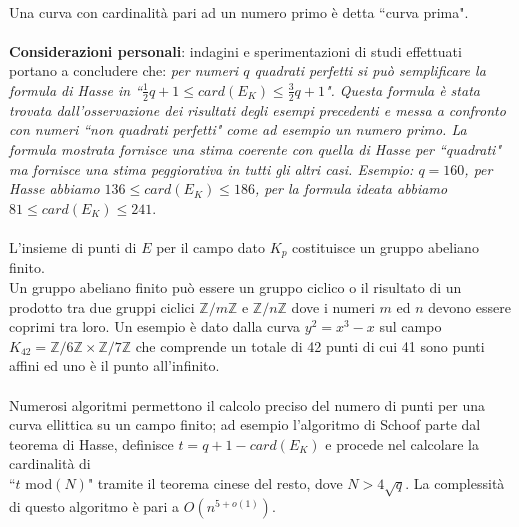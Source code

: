 \documentclass[a4paper,12pt]{tesiinfo}
\newcommand\ddfrac[2]{\frac{\displaystyle #1}{\displaystyle #2}}
\begin{document}
\\
Una curva con cardinalit\`a pari ad un numero primo \`e detta ``curva prima".
\\
\\
\textbf{Considerazioni personali}: indagini e sperimentazioni di studi effettuati portano a concludere che: \textit{per numeri $q$ quadrati perfetti si pu\`o semplificare la formula di Hasse in ``$ \ddfrac{1}{2}q +1 \le card(E_K) \le \ddfrac{3}{2}q +1$". Questa formula \`e stata trovata dall'osservazione dei risultati degli esempi precedenti e messa a confronto con numeri ``non quadrati perfetti" come ad esempio un numero primo. La formula mostrata fornisce una stima coerente con quella di Hasse per ``quadrati" ma fornisce una stima peggiorativa in tutti gli altri casi. Esempio: $q=160$, per Hasse abbiamo $136 \le card(E_K) \le 186$, per la formula ideata abbiamo $81 \le card(E_K) \le 241$}. 
\\
\\
L'insieme di punti di $E$ per il campo dato $K_p$ costituisce un gruppo abeliano finito. 
\\
Un gruppo abeliano finito pu\`o essere un gruppo ciclico o il risultato di un prodotto tra due gruppi ciclici $\mathbb{Z}/m\mathbb{Z}$ e $\mathbb{Z}/n\mathbb{Z}$ dove i numeri $m$ ed $n$ devono essere coprimi tra loro. Un esempio \`e dato dalla curva $y^2 = x^3 - x$ sul campo $K_{42} = \mathbb{Z}/6\mathbb{Z}\times\mathbb{Z}/7\mathbb{Z}$ che comprende un totale di 42 punti di cui 41 sono punti affini ed uno \`e il punto all'infinito.
\\
\\
Numerosi algoritmi permettono il calcolo preciso del numero di punti per una curva ellittica su un campo finito; ad esempio l'algoritmo di Schoof parte dal teorema di Hasse, definisce $t = q+1-card(E_K)$ e procede nel calcolare la cardinalit\`a di \\``$t$ mod$(N)$" tramite il teorema cinese del resto, dove $N > 4\sqrt{q}$. La complessit\`a di questo algoritmo \`e pari a $O(n^{5+o(1)})$.
%
\end{document}
